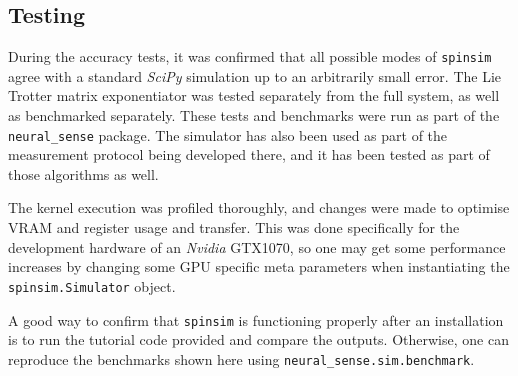 \documentclass{jors}
\begin{document}

	\subsection*{Testing}
		During the accuracy tests, it was confirmed that all possible modes of \texttt{spinsim} agree with a standard \emph{SciPy} simulation up to an arbitrarily small error. The Lie Trotter matrix exponentiator was tested separately from the full system, as well as benchmarked separately. These tests and benchmarks were run as part of the \texttt{neural\_sense} package. The simulator has also been used as part of the measurement protocol being developed there, and it has been tested as part of those algorithms as well.

		The kernel execution was profiled thoroughly, and changes were made to optimise VRAM and register usage and transfer. This was done specifically for the development hardware of an \emph{Nvidia} GTX1070, so one may get some performance increases by changing some GPU specific meta parameters when instantiating the \texttt{spinsim.Simulator} object.

		A good way to confirm that \texttt{spinsim} is functioning properly after an installation is to run the tutorial code provided and compare the outputs. Otherwise, one can reproduce the benchmarks shown here using \texttt{neural\_sense.sim.benchmark}.
\end{document}
